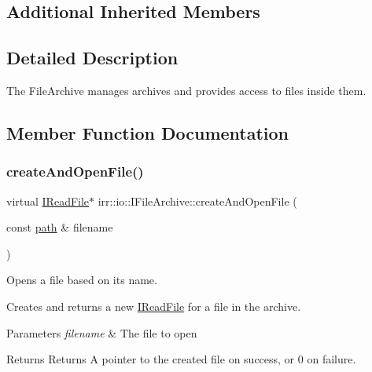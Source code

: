 \subsection*{Additional Inherited Members}


\subsection{Detailed Description}
The File\+Archive manages archives and provides access to files inside them. 

\subsection{Member Function Documentation}
\mbox{\label{classirr_1_1io_1_1IFileArchive_a5c3b4994ae63447d2634dd86b3069988}} 
\subsubsection{\texorpdfstring{create\+And\+Open\+File()}{createAndOpenFile()}\hspace{0.1cm}{\footnotesize\ttfamily [1/4]}}
{\footnotesize\ttfamily virtual \hyperlink{classirr_1_1io_1_1IReadFile}{I\+Read\+File}$\ast$ irr\+::io\+::\+I\+File\+Archive\+::create\+And\+Open\+File (\begin{DoxyParamCaption}\item[{const \hyperlink{namespaceirr_1_1io_a6468281622ce3a1c46b72e19f32dded5}{path} \&}]{filename }\end{DoxyParamCaption})\hspace{0.3cm}{\ttfamily [pure virtual]}}



Opens a file based on its name. 

Creates and returns a new \hyperlink{classirr_1_1io_1_1IReadFile}{I\+Read\+File} for a file in the archive. 
\begin{DoxyParams}{Parameters}
{\em filename} & The file to open \\
\hline
\end{DoxyParams}
\begin{DoxyReturn}{Returns}
Returns A pointer to the created file on success, or 0 on failure. 
\end{DoxyReturn}
\mbox{\label{classirr_1_1io_1_1IFileArchive_a5c3b4994ae63447d2634dd86b3069988}} 
